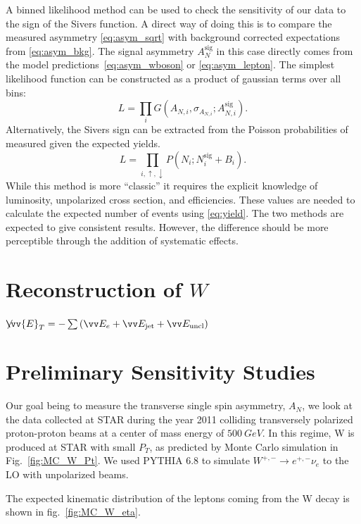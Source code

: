 \documentclass[12pt]{article}
\newcommand{\missET}{\not\!\!\vv{E}_T}
\begin{document}
A binned likelihood method can be used to check the sensitivity of our data to
the sign of the Sivers function. A direct way of doing this is to compare the
measured asymmetry \eqref{eq:asym_sqrt} with background corrected expectations
from \eqref{eq:asym_bkg}. The signal asymmetry $A^\text{sig}_N$ in this case
directly comes from the model predictions~\eqref{eq:asym_wboson} or
\eqref{eq:asym_lepton}. The simplest likelihood function can be constructed as a
product of gaussian terms over all bins:
%
\begin{equation}
L = \prod\limits_i G(A_{N,i}, \sigma_{A_{N,i}}; A^\text{sig}_{N,i}).
\end{equation}
%
Alternatively, the Sivers sign can be extracted from the Poisson probabilities
of measured given the expected yields.
%
\begin{equation}
L = \prod\limits_{i,\uparrow,\downarrow} P(N_i; N^\text{sig}_{i} + B_i).
\end{equation}
%
While this method is more ``classic'' it requires the explicit knowledge of
luminosity, unpolarized cross section, and efficiencies. These values are needed
to calculate the expected number of events using \eqref{eq:yield}. The two
methods are expected to give consistent results. However, the difference should
be more perceptible through the addition of systematic effects.



\section{Reconstruction of $W$}

$\missET = - \sum \left( \vv E_e + \vv E_\text{jet} +  \vv E_\text{uncl} \right)$


\section{Preliminary Sensitivity Studies}

Our goal being to measure the transverse single spin asymmetry, $A_N$, we look at 
the data collected at STAR during the year 2011 colliding transversely polarized 
proton-proton beams at a center of mass energy of $500~GeV$.   In this regime, W 
is produced at STAR with small $P_T$, as predicted by Monte Carlo simulation in 
Fig.~\ref{fig:MC_W_Pt}. We used PYTHIA 6.8 to simulate $W^{+,-}\rightarrow e^{+,-}\nu_e$ 
to the LO with unpolarized beams. 


The expected kinematic distribution of the leptons coming from the W decay is
shown in fig.~\ref{fig:MC_W_eta}.
\end{document}
